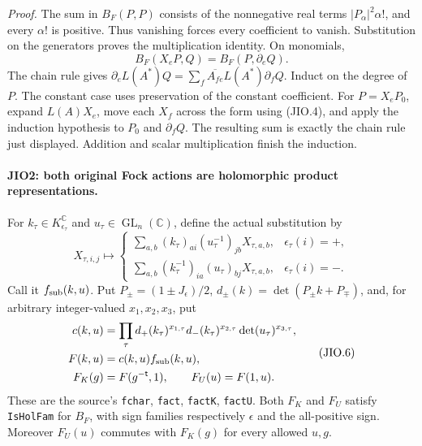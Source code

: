 \emph{Proof.}
The sum in \(B_F(P,P)\) consists of the nonnegative real terms
\(|P_\alpha|^2\alpha!\), and every \(\alpha!\) is positive.  Thus
vanishing forces every coefficient to vanish.  Substitution on the
generators proves the multiplication identity.  On monomials,
\[
       B_F(X_eP,Q)=B_F(P,\partial_eQ).
 \tag{JIO.4}
\]
The chain rule gives
\(\partial_eL(A^*)Q=\sum_f\overline{A_{fe}}L(A^*)\partial_fQ\).
Induct on the degree of \(P\).  The constant case uses preservation
of the constant coefficient.  For \(P=X_eP_0\), expand \(L(A)X_e\),
move each \(X_f\) across the form using (JIO.4), and apply the
induction hypothesis to \(P_0\) and \(\partial_fQ\).  The resulting
sum is exactly the chain rule just displayed.  Addition and scalar
multiplication finish the induction.

\paragraph{JIO2: both original Fock actions are holomorphic product representations.}
\label{claim:JIO2}
For \(k_\tau\in K_{\epsilon_\tau}^{\mathbb C}\) and
\(u_\tau\in\operatorname{GL}_n(\mathbb C)\), define the actual
substitution by
\[
 X_{\tau,i,j}\longmapsto
 \begin{cases}
 \displaystyle\sum_{a,b}(k_\tau)_{ai}(u_\tau^{-1})_{jb}X_{\tau,a,b},
                                           &\epsilon_\tau(i)=+,\\
 \displaystyle\sum_{a,b}(k_\tau^{-1})_{ia}(u_\tau)_{bj}X_{\tau,a,b},
                                           &\epsilon_\tau(i)=-.
 \end{cases}
 \tag{JIO.5}
\]
Call it \(f_{\rm sub}(k,u)\).  Put \(P_\pm=(1\pm J_\epsilon)/2\),
\(d_\pm(k)=\det(P_\pm k+P_\mp)\), and, for arbitrary integer-valued
\(x_1,x_2,x_3\), put
\[
 \begin{split}
 c(k,u)&=\prod_\tau d_+(k_\tau)^{x_{1,\tau}}
                      d_-(k_\tau)^{x_{2,\tau}}
                      \det(u_\tau)^{x_{3,\tau}},\\
 F(k,u)&=c(k,u)f_{\rm sub}(k,u),\\
 F_K(g)&=F(g^{-\mathsf t},1),\qquad F_U(u)=F(1,u).
 \end{split}
 \tag{JIO.6}
\]
These are the source's \texttt{fchar}, \texttt{fact},
\texttt{factK}, \texttt{factU}.  Both \(F_K\) and \(F_U\) satisfy
\texttt{IsHolFam} for \(B_F\), with sign families respectively
\(\epsilon\) and the all-positive sign.  Moreover \(F_U(u)\)
commutes with \(F_K(g)\) for every allowed \(u,g\).

